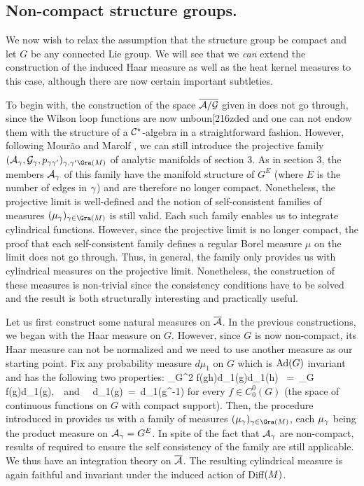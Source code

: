 \subsection{Non-compact structure groups.} 

We now wish to relax the assumption that the structure group be
compact and let $G$ be any connected Lie group.  We will see that we
{\it can} extend the construction of the induced Haar measure as well
as the heat kernel measures to this case, although there are now
certain important subtleties.

To begin with, the construction of the space $\agb$ given in \cite{AI}
does not go through, since the Wilson loop functions are now unboun[216zded
and one can not endow them with the structure of a $\C^\star$-algebra in
a straightforward fashion. However, following Mour\~ao and Marolf
\cite{MM}, we can still introduce the projective family $(\A_\g,
\G_\g,p_{\g\g'})_{\g, \g'\Gra(\S)}$ of analytic manifolds of
section 3. As in section 3, the members $\A_{\g}$ of this family have
the manifold structure of $G^{E}$ (where $E$ is the number of edges in
$\g$) and are therefore no longer compact. Nonetheless, the projective
limit is well-defined and the notion of self-consistent families of
measures $(\mu_{\g})_{\g\in\Gra(\S)}$ is still valid. Each such family
enables us to integrate cylindrical functions. However, since the
projective limit is no longer compact, the proof \cite{AL2} that each
self-consistent family defines a regular Borel measure $\mu$ on the
limit does not go through. Thus, in general, the family only provides
us with cylindrical measures on the projective limit. Nonetheless, the
construction of these measures is non-trivial since the consistency
conditions have to be solved and the result is both structurally
interesting and practically useful.

Let us first construct some natural measures on $\Ab$. In the previous
constructions, we began with the Haar measure on $G$. However, since
$G$ is now non-compact, its Haar measure can not be normalized and we
need to use another measure as our starting point. Fix any probability
measure $d\mu_1$ on $G$ which is $\Ad(G)$ invariant and has the
following two properties:
\be
\int_{G^2} f(gh)d\mu_1(g)d\mu_1(h) \ =\ \int_G f(g)d\mu_1(g),\ \ 
{\rm and} \ \ d\mu_1(g)\ =\ d\mu_1(g^{-1})
\ee
for every $f\in C^0_0(G)$ (the space of continuous functions on $G$
with compact support). Then, the procedure introduced in \cite{AL1}
provides us with a family of measures $(\mu_\g)_{\g\in\Gra(\S)}$, each
$\mu_{\g}$ being the product measure on $\A_\g=G^E$. In spite of the
fact that $\A_{\g}$ are non-compact, results of \cite{AL1} required to
ensure the self consistency of the family are still applicable. We
thus have an integration theory on $\Ab$. The resulting cylindrical
measure is again faithful and invariant under the induced action of
Diff$(\S)$.

